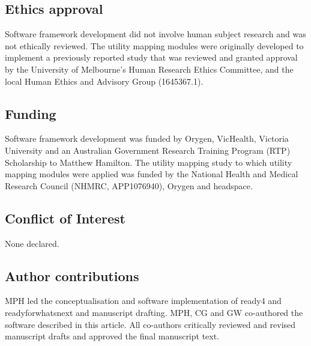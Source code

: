 \documentclass[sn-vancouver,Numbered,pdflatex]{sn-jnl}
\theoremstyle{remark}
\theoremstyle{definition}
\begin{document}
\hypertarget{ethics-approval}{%
\subsection*{Ethics approval}\label{ethics-approval}}

Software framework development did not involve human subject research and was not ethically reviewed. The utility mapping modules were originally developed to implement a previously reported study that was reviewed and granted approval by the University of Melbourne's Human Research Ethics Committee, and the local Human Ethics and Advisory Group (1645367.1).

\hypertarget{funding}{%
\subsection*{Funding}\label{funding}}

Software framework development was funded by Orygen, VicHealth, Victoria University and an Australian Government Research Training Program (RTP) Scholarship to Matthew Hamilton. The utility mapping study to which utility mapping modules were applied was funded by the National Health and Medical Research Council (NHMRC, APP1076940), Orygen and headspace.

\hypertarget{conflict-of-interest}{%
\subsection*{Conflict of Interest}\label{conflict-of-interest}}

None declared.

\hypertarget{author-contributions}{%
\subsection*{Author contributions}\label{author-contributions}}

MPH led the conceptualisation and software implementation of ready4 and readyforwhatsnext and manuscript drafting. MPH, CG and GW co-authored the software described in this article. All co-authors critically reviewed and revised manuscript drafts and approved the final manuscript text.

\newpage
\appendix
{}


\end{document}

